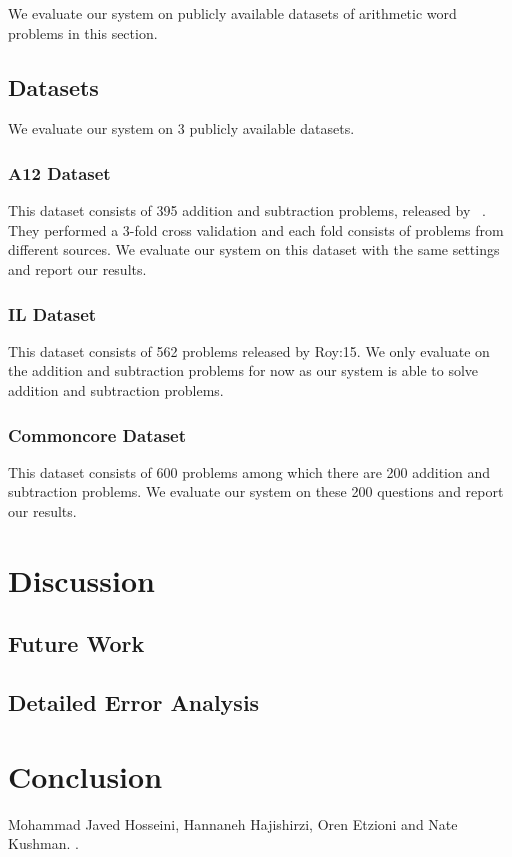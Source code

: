 \documentclass[11pt]{article}
\begin{document}
We evaluate our system on publicly available datasets of arithmetic word problems in this section. %

\subsection{Datasets}
We evaluate our system on 3 publicly available datasets. 

\subsubsection{A12 Dataset}
This dataset consists of 395 addition and subtraction problems, released by ~\cite{Hosseini:14}. They performed a 3-fold cross validation and each fold consists of problems from different sources. We evaluate our system on this dataset with the same settings and report our results.

\subsubsection{IL Dataset}
This dataset consists of 562 problems released by {Roy:15}. We only evaluate on the addition and subtraction problems for now as our system is able to solve addition and subtraction problems.

\subsubsection{Commoncore Dataset}
This dataset consists of 600 problems among which there are 200 addition and subtraction problems. We evaluate our system on these 200 questions and report our results. 
\section{Discussion}
\subsection{Future Work}
\subsection{Detailed Error Analysis}

\section{Conclusion}
\begin{thebibliography}{}
  
  Mohammad Javed Hosseini, Hannaneh Hajishirzi, Oren Etzioni and Nate Kushman.
  .
  
\end{thebibliography}
\end{document}
